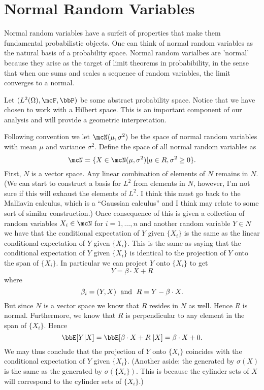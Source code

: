 \documentclass{report}
\begin{document}
\chapter{Normal Random Variables}

Normal random variables have a surfeit of properties that make them fundamental probabilistic objects.  One can think of normal random variables as the natural basis of a probability space.  Normal random varialbes are 'normal' because they arise as the target of limit theorems in probabibility, in the sense that when one sums and scales a sequence of random variables, the limit converges to a normal.

Let $(L^2(\Omega), \mcF, \bbP)$ be some abstract probability space.  Notice that we have chosen to work with a Hilbert space.  This is an important component of our analysis and will provide a geometric interpretation.

Following convention we let $\mcN(\mu, \sigma^2)$ be the space of normal random variables with mean $\mu$ and variance $\sigma^2$.  Define the space of all normal random variables as
\[
\mcN = \{ X \in \mcN(\mu, \sigma^2) | \mu \in R, \sigma^2 \geq 0 \}.
\]
First, $N$ is a vector space.  Any linear combination of elements of $N$ remains in $N$.  (We can start to construct a basis for $L^2$ from elements in $N$, however, I'm not sure if this will exhaust the elements of $L^2$.  I think this must go back to the Malliavin calculus, which is a ``Gaussian calculus'' and I think may relate to some sort of similar construction.)  Once consequence of this is given a collection of random variables $X_i \in \mcN$ for $i = 1, \ldots, n$ and another random variable $Y \in N$ we have that the conditional expectation of $Y$ given $\{X_i\}$ is the same as the linear conditional expectation of $Y$ given $\{X_i\}$.  This is the same as saying that the conditional expectation of $Y$ given $\{X_i\}$ is identical to the projection of $Y$ onto the span of $\{X_i\}$.  In particular we can project $Y$ onto $\{X_i\}$ to get
\[
Y = \beta \cdot X + R
\]
where
\[
\beta_i = (Y,X) \; \textmd{ and } \; R = Y - \beta \cdot X.
\]
But since $N$ is a vector space we know that $R$ resides in $N$ as well.  Hence $R$ is normal.  Furthermore, we know that $R$ is perpendicular to any element in the span of $\{X_i\}$.  Hence
\[
\bbE[Y | X ] = \bbE[\beta \cdot X + R \; | X] = \beta \cdot X + 0.
\]
We may thus conclude that the projection of $Y$ onto $\{X_i\}$ coincides with the conditional expectation of $Y$ given $\{X_i\}$.
(Another aside: the \sigalg generated by $\sigma(X)$ is the same as the \sigalg generated by $\sigma(\{X_i\})$.  This is because the cylinder sets of $X$ will correspond to the cylinder sets of $\{X_i\}$.)
\end{document}
